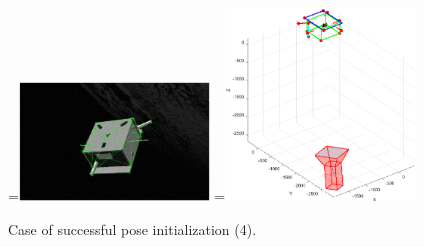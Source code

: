 \begin{figure}[htpb]
  =\hbox{\includegraphics[width=0.45\textwidth]{gfx/PoseDetermination/trial311modelMap.eps}}%
  =\hbox{\includegraphics[width=0.45\textwidth]{gfx/PoseDetermination/cameraWRTSC311.eps}}%
  {\,} \hfill
   \hfill
   \hfill
  {\,}
  \caption{Case of successful pose initialization (4).}
  \label{fig:EVVAI4}
\end{figure}

